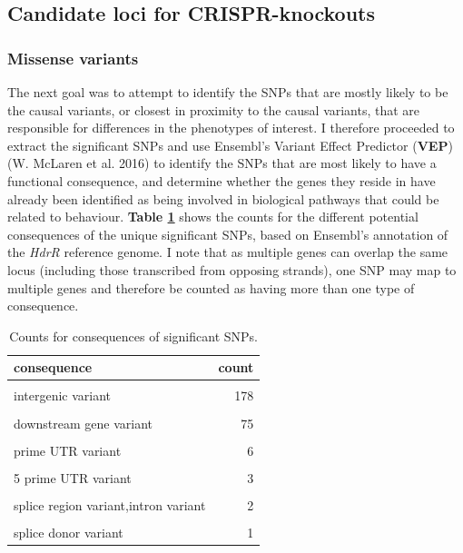 \documentclass[
]{book}
\begin{document}
\hypertarget{candidate-loci-for-crispr-knockouts}{%
\subsection{Candidate loci for CRISPR-knockouts}\label{candidate-loci-for-crispr-knockouts}}

\hypertarget{missense-variants}{%
\subsubsection{Missense variants}\label{missense-variants}}

The next goal was to attempt to identify the SNPs that are mostly likely to be the causal variants, or closest in proximity to the causal variants, that are responsible for differences in the phenotypes of interest. I therefore proceeded to extract the significant SNPs and use Ensembl's Variant Effect Predictor (\textbf{VEP}) (W. McLaren et al. 2016) to identify the SNPs that are most likely to have a functional consequence, and determine whether the genes they reside in have already been identified as being involved in biological pathways that could be related to behaviour. \textbf{Table \ref{tab:F2-sig-snps-consq-counts}} shows the counts for the different potential consequences of the unique significant SNPs, based on Ensembl's annotation of the \emph{HdrR} reference genome. I note that as multiple genes can overlap the same locus (including those transcribed from opposing strands), one SNP may map to multiple genes and therefore be counted as having more than one type of consequence.

\begin{table}

\caption{\label{tab:F2-sig-snps-consq-counts}Counts for consequences of significant SNPs.}
\centering
\begin{tabular}[t]{lr}
\toprule
consequence & count\\
\midrule
\cellcolor{gray!6}{intron variant} & \cellcolor{gray!6}{349}\\
intergenic variant & 178\\
\cellcolor{gray!6}{upstream gene variant} & \cellcolor{gray!6}{92}\\
downstream gene variant & 75\\
\cellcolor{gray!6}{synonymous variant} & \cellcolor{gray!6}{9}\\
\addlinespace
3 prime UTR variant & 6\\
\cellcolor{gray!6}{missense variant} & \cellcolor{gray!6}{6}\\
5 prime UTR variant & 3\\
\cellcolor{gray!6}{splice acceptor variant} & \cellcolor{gray!6}{2}\\
splice region variant,intron variant & 2\\
\addlinespace
\cellcolor{gray!6}{splice region variant,synonymous variant} & \cellcolor{gray!6}{2}\\
splice donor variant & 1\\
\bottomrule
\end{tabular}
\end{table}
\end{document}
